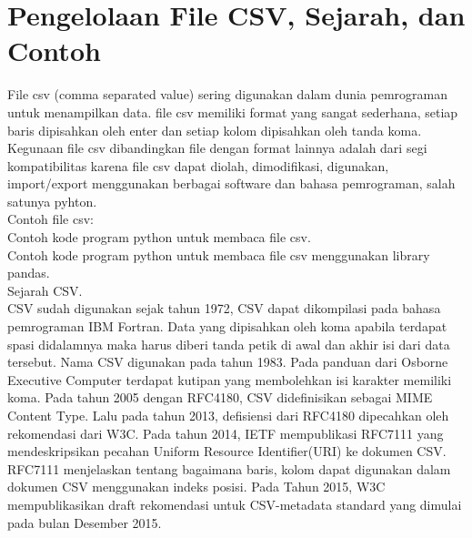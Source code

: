 \section{Pengelolaan File CSV, Sejarah, dan Contoh}
File csv (comma separated value) sering digunakan dalam dunia pemrograman untuk menampilkan data. file csv memiliki format yang sangat sederhana, setiap baris dipisahkan oleh enter dan setiap kolom dipisahkan oleh tanda koma.\\
Kegunaan file csv dibandingkan file dengan format lainnya adalah dari segi kompatibilitas karena file csv dapat diolah, dimodifikasi, digunakan, import/export menggunakan berbagai software dan bahasa pemrograman, salah satunya pyhton.\\
Contoh file csv:\\

Contoh kode program python untuk membaca file csv.\\

Contoh kode program python untuk membaca file csv menggunakan library pandas.\\

Sejarah CSV.\\
CSV sudah digunakan sejak tahun 1972, CSV dapat dikompilasi pada bahasa pemrograman IBM Fortran. Data yang dipisahkan oleh koma apabila terdapat spasi didalamnya maka harus diberi tanda petik di awal dan akhir isi dari data tersebut. Nama CSV digunakan pada tahun 1983. Pada panduan dari Osborne Executive Computer terdapat kutipan yang membolehkan isi karakter memiliki koma. Pada tahun 2005 dengan RFC4180, CSV didefinisikan sebagai MIME Content Type. Lalu pada tahun 2013, defisiensi dari RFC4180 dipecahkan oleh rekomendasi dari W3C. Pada tahun 2014, IETF mempublikasi RFC7111 yang mendeskripsikan pecahan Uniform Resource Identifier(URI) ke dokumen CSV. RFC7111 menjelaskan tentang bagaimana baris, kolom dapat digunakan dalam dokumen CSV menggunakan indeks posisi. Pada Tahun 2015, W3C mempublikasikan draft rekomendasi untuk CSV-metadata standard yang dimulai pada bulan Desember 2015. 
